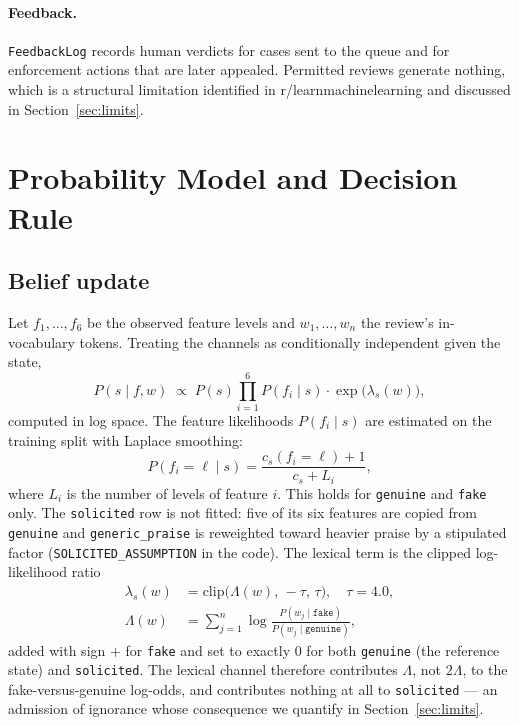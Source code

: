 \documentclass{article}
\begin{document}
\paragraph{Feedback.}
\texttt{FeedbackLog} records human verdicts for cases sent to the queue and for
enforcement actions that are later appealed. Permitted reviews generate
nothing, which is a structural limitation identified in r/learnmachinelearning
and discussed in Section~\ref{sec:limits}.

\section{Probability Model and Decision Rule}

\subsection{Belief update}

Let $f_1,\dots,f_6$ be the observed feature levels and $w_1,\dots,w_n$ the
review's in-vocabulary tokens. Treating the channels as conditionally
independent given the state,
\begin{equation}
    P(s \mid f, w) \;\propto\; P(s)\prod_{i=1}^{6}P(f_i \mid s)\cdot
    \exp\!\big(\lambda_s(w)\big),
    \label{eq:posterior}
\end{equation}
computed in log space. The feature likelihoods $P(f_i \mid s)$ are estimated on
the training split with Laplace smoothing:
\begin{equation}
    P(f_i = \ell \mid s) = \frac{c_s(f_i = \ell) + 1}{c_s + L_i},
\end{equation}
where $L_i$ is the number of levels of feature $i$. This holds for
\texttt{genuine} and \texttt{fake} only. The \texttt{solicited} row is not
fitted: five of its six features are copied from \texttt{genuine} and
\texttt{generic\_praise} is reweighted toward heavier praise by a stipulated
factor (\texttt{SOLICITED\_ASSUMPTION} in the code). The lexical term is the
clipped log-likelihood ratio
\begin{equation}
\begin{split}
    \lambda_s(w) &= \mathrm{clip}\big(\Lambda(w),\,-\tau,\,\tau\big),
    \quad \tau = 4.0,\\
    \Lambda(w)   &= \sum_{j=1}^{n}
    \log\frac{P(w_j \mid \texttt{fake})}{P(w_j \mid \texttt{genuine})},
\end{split}
    \label{eq:llr}
\end{equation}
added with sign $+$ for \texttt{fake} and set to exactly $0$ for both
\texttt{genuine} (the reference state) and \texttt{solicited}. The lexical
channel therefore contributes $\Lambda$, not $2\Lambda$, to the
fake-versus-genuine log-odds, and contributes nothing at all to
\texttt{solicited} --- an admission of ignorance whose consequence we quantify
in Section~\ref{sec:limits}.
\end{document}
